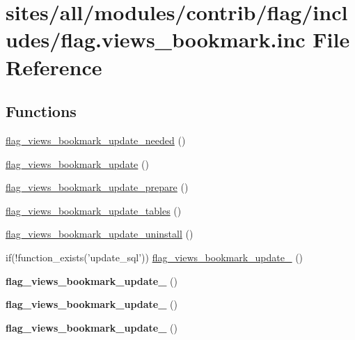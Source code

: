 \hypertarget{flag_8views__bookmark_8inc}{
\section{sites/all/modules/contrib/flag/includes/flag.views\_\-bookmark.inc File Reference}
\label{flag_8views__bookmark_8inc}
}
\subsection*{Functions}
\begin{CompactItemize}
\item 
\hyperlink{flag_8views__bookmark_8inc_d5cfa5dcf805c66fc0c86511acb5a237}{flag\_\-views\_\-bookmark\_\-update\_\-needed} ()
\item 
\hyperlink{flag_8views__bookmark_8inc_a39d7b88115e14a84c01e143c335d838}{flag\_\-views\_\-bookmark\_\-update} ()
\item 
\hyperlink{flag_8views__bookmark_8inc_704c0e040a36590d94bb0bc590f6b66b}{flag\_\-views\_\-bookmark\_\-update\_\-prepare} ()
\item 
\hyperlink{flag_8views__bookmark_8inc_e8493a9a414b2bef1c9424ef50c2f156}{flag\_\-views\_\-bookmark\_\-update\_\-tables} ()
\item 
\hyperlink{flag_8views__bookmark_8inc_7a09022a28d65c81520220f3cd778ba3}{flag\_\-views\_\-bookmark\_\-update\_\-uninstall} ()
\item 
if(!function\_\-exists('update\_\-sql')) \hyperlink{flag_8views__bookmark_8inc_9ce164c1880b7c9c3b5b51c3b2aa06d6}{flag\_\-views\_\-bookmark\_\-update\_} ()
\item 
\hypertarget{flag_8views__bookmark_8inc_c0d6f2d8acf0ff099719cb3c175498e6}{
\textbf{flag\_\-views\_\-bookmark\_\-update\_} ()}
\label{flag_8views__bookmark_8inc_c0d6f2d8acf0ff099719cb3c175498e6}

\item 
\hypertarget{flag_8views__bookmark_8inc_2fe53181dec852cbe713e2e9cb59f9a2}{
\textbf{flag\_\-views\_\-bookmark\_\-update\_} ()}
\label{flag_8views__bookmark_8inc_2fe53181dec852cbe713e2e9cb59f9a2}

\item 
\hypertarget{flag_8views__bookmark_8inc_c76205bb587f800558165b3a97b7c4fc}{
\textbf{flag\_\-views\_\-bookmark\_\-update\_} ()}
\label{flag_8views__bookmark_8inc_c76205bb587f800558165b3a97b7c4fc}


\end{CompactItemize}
